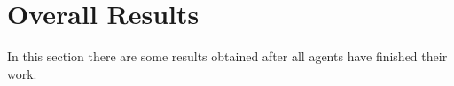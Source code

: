 \documentclass[12pt]{article}
\begin{document}
    \newpage

    \section{Overall Results}
    In this section there are some results obtained after all agents have finished their work.

    \begin{figure}[H]
        \centering     %
    \end{figure}
\end{document}
